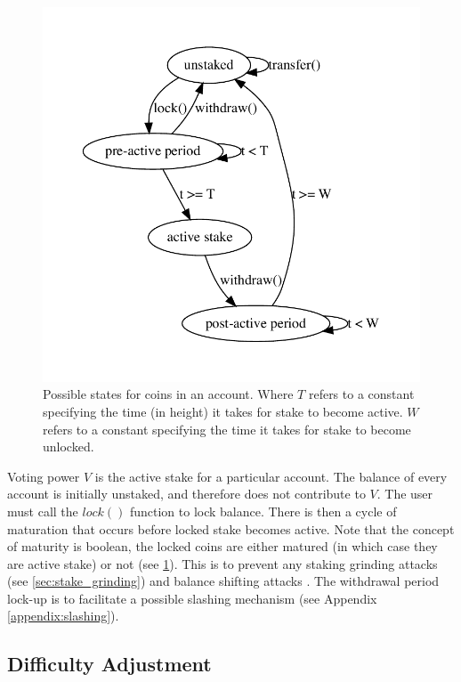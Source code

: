 \documentclass[a4paper]{article}
\begin{document}
\begin{figure}[h]
    \centering
    \includegraphics[scale=0.5]{assets/stake_state}
    \caption{Possible states for coins in an account. Where $T$ refers to a constant specifying the time (in height) it takes for stake to become active. $W$ refers to a constant specifying the time it takes for stake to become unlocked.}
    \label{fig:stake_state}
\end{figure}

Voting power $V$ is the active stake for a particular account. The balance of every account is initially unstaked, and therefore does not contribute to $V$. The user must call the $lock()$ function to lock balance. There is then a cycle of maturation that occurs before locked stake becomes active. Note that the concept of maturity is boolean, the locked coins are either matured (in which case they are active stake) or not (see \cref{fig:stake_state}). This is to prevent any staking grinding attacks (see \cref{sec:stake_grinding}) and balance shifting attacks \cite{nxt_wiki}. The withdrawal period lock-up is to facilitate a possible slashing mechanism (see Appendix \ref{appendix:slashing}).

\subsection{Difficulty Adjustment}
\label{diff_adj}
\end{document}
